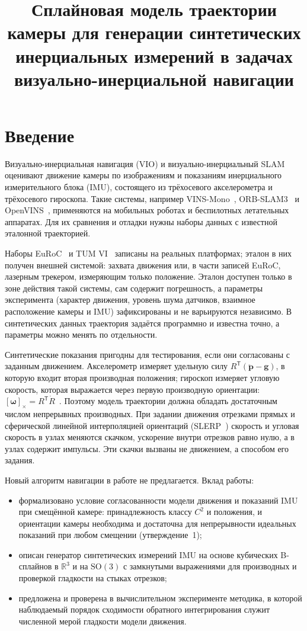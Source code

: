 \documentclass{misisarticle}
\title{Сплайновая модель траектории камеры для генерации синтетических инерциальных измерений в задачах визуально-инерциальной навигации}
\newcommand{\cross}[1]{[#1]_{\times}}
\newcommand{\R}{\mathbb{R}}
\newcommand{\SO}{\mathrm{SO}(3)}
\newcommand{\T}{^{\mathsf{T}}}
\newcommand{\vb}[1]{\mathbf{#1}}
\begin{document}
\maketitle

\section{Введение}

Визуально-инерциальная навигация (VIO) и визуально-инерциальный SLAM оценивают движение камеры по изображениям и показаниям инерциального измерительного блока (IMU), состоящего из трёхосевого акселерометра и трёхосевого гироскопа. Такие системы, например VINS-Mono~\cite{vinsmono}, ORB-SLAM3~\cite{orbslam3} и OpenVINS~\cite{openvins}, применяются на мобильных роботах и беспилотных летательных аппаратах. Для их сравнения и отладки нужны наборы данных с известной эталонной траекторией.

Наборы EuRoC~\cite{euroc} и TUM VI~\cite{tumvi} записаны на реальных платформах; эталон в них получен внешней системой: захвата движения или, в части записей EuRoC, лазерным трекером, измеряющим только положение. Эталон доступен только в зоне действия такой системы, сам содержит погрешность, а параметры эксперимента (характер движения, уровень шума датчиков, взаимное расположение камеры и IMU) зафиксированы и не варьируются независимо. В синтетических данных траектория задаётся программно и известна точно, а параметры можно менять по отдельности.

Синтетические показания пригодны для тестирования, если они согласованы с заданным движением. Акселерометр измеряет удельную силу $R\T(\ddot{\vb p}-\vb g)$, в которую входит вторая производная положения; гироскоп измеряет угловую скорость, которая выражается через первую производную ориентации: $\cross{\boldsymbol\omega}=R\T\dot R$~\cite{woodman}. Поэтому модель траектории должна обладать достаточным числом непрерывных производных. При задании движения отрезками прямых и сферической линейной интерполяцией ориентаций (SLERP~\cite{shoemake}) скорость и угловая скорость в узлах меняются скачком, ускорение внутри отрезков равно нулю, а в узлах содержит импульсы. Эти скачки вызваны не движением, а способом его задания.

Новый алгоритм навигации в работе не предлагается. Вклад работы:
\begin{itemize}
  \item формализовано условие согласованности модели движения и показаний IMU при смещённой камере: принадлежность классу $C^2$ и положения, и ориентации камеры необходима и достаточна для непрерывности идеальных показаний при любом смещении (утверждение~1);
  \item описан генератор синтетических измерений IMU на основе кубических B-сплайнов в $\R^3$ и на $\SO$ с замкнутыми выражениями для производных и проверкой гладкости на стыках отрезков;
  \item предложена и проверена в вычислительном эксперименте методика, в которой наблюдаемый порядок сходимости обратного интегрирования служит численной мерой гладкости модели движения.
\end{itemize}
\end{document}

